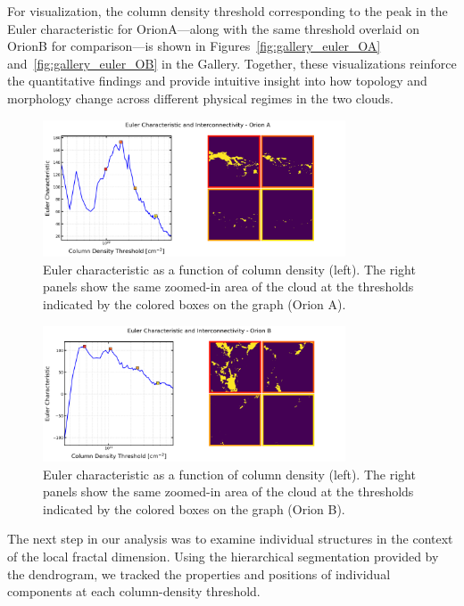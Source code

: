For visualization, the column density threshold corresponding to the peak in the Euler characteristic for OrionA—along with the same threshold overlaid on OrionB for comparison—is shown in Figures~\ref{fig:gallery_euler_OA} and~\ref{fig:gallery_euler_OB} in the Gallery.
Together, these visualizations reinforce the quantitative findings and provide intuitive insight into how topology and morphology change across different physical regimes in the two clouds.

\begin{figure}[t]
    \centering
    \includegraphics[width=0.8\textwidth]{figures/euler_Orion_A.png}
    \caption{Euler characteristic as a function of column density (left). The right panels show the same zoomed-in area of the cloud at the thresholds indicated by the colored boxes on the graph (Orion A).}
    \label{fig:Euler_Orion_A}
\end{figure}

\begin{figure}[t]
    \centering
    \includegraphics[width=0.8\textwidth]{figures/euler_Orion_B.png}
    \caption{Euler characteristic as a function of column density (left). The right panels show the same zoomed-in area of the cloud at the thresholds indicated by the colored boxes on the graph (Orion B).}
    \label{fig:Euler_Orion_B}
\end{figure}

The next step in our analysis was to examine individual structures in the context of the local fractal dimension.  
Using the hierarchical segmentation provided by the dendrogram, we tracked the properties and positions of individual components at each column-density threshold.

